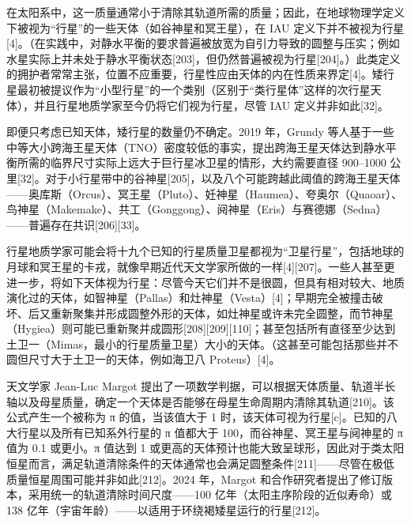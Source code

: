 在太阳系中，这一质量通常小于清除其轨道所需的质量；因此，在地球物理学定义下被视为“行星”的一些天体（如谷神星和冥王星），在 IAU 定义下并不被视为行星[4]。（在实践中，对静水平衡的要求普遍被放宽为自引力导致的圆整与压实；例如水星实际上并未处于静水平衡状态[203]，但仍然普遍被视为行星[204]。）此类定义的拥护者常常主张，位置不应重要，行星性应由天体的内在性质来界定[4]。矮行星最初被提议作为“小型行星”的一个类别（区别于“类行星体”这样的次行星天体），并且行星地质学家至今仍将它们视为行星，尽管 IAU 定义并非如此[32]。

即便只考虑已知天体，矮行星的数量仍不确定。2019 年，Grundy 等人基于一些中等大小跨海王星天体（TNO）密度较低的事实，提出跨海王星天体达到静水平衡所需的临界尺寸实际上远大于巨行星冰卫星的情形，大约需要直径 900–1000 公里[32]。对于小行星带中的谷神星[205]，以及八个可能跨越此阈值的跨海王星天体——奥库斯（Orcus）、冥王星（Pluto）、妊神星（Haumea）、夸奥尔（Quaoar）、鸟神星（Makemake）、共工（Gonggong）、阋神星（Eris）与赛德娜（Sedna）——普遍存在共识[206][33]。

行星地质学家可能会将十九个已知的行星质量卫星都视为“卫星行星”，包括地球的月球和冥王星的卡戎，就像早期近代天文学家所做的一样[4][207]。一些人甚至更进一步，将如下天体视为行星：尽管今天它们并不是很圆，但具有相对较大、地质演化过的天体，如智神星（Pallas）和灶神星（Vesta）[4]；早期完全被撞击破坏、后又重新聚集并形成圆整外形的天体，如灶神星或许未完全圆整，而节神星（Hygiea）则可能已重新聚并成圆形[208][209][110]；甚至包括所有直径至少达到土卫一（Mimas，最小的行星质量卫星）大小的天体。（这甚至可能包括那些并不圆但尺寸大于土卫一的天体，例如海卫八 Proteus）[4]。

天文学家 Jean-Luc Margot 提出了一项数学判据，可以根据天体质量、轨道半长轴以及母星质量，确定一个天体是否能够在母星生命周期内清除其轨道[210]。该公式产生一个被称为 π 的值，当该值大于 1 时，该天体可视为行星[c]。已知的八大行星以及所有已知系外行星的 π 值都大于 100，而谷神星、冥王星与阋神星的 π 值为 0.1 或更小。π 值达到 1 或更高的天体预计也能大致呈球形，因此对于类太阳恒星而言，满足轨道清除条件的天体通常也会满足圆整条件[211]——尽管在极低质量恒星周围可能并非如此[212]。2024 年，Margot 和合作研究者提出了修订版本，采用统一的轨道清除时间尺度——100 亿年（太阳主序阶段的近似寿命）或 138 亿年（宇宙年龄）——以适用于环绕褐矮星运行的行星[212]。

